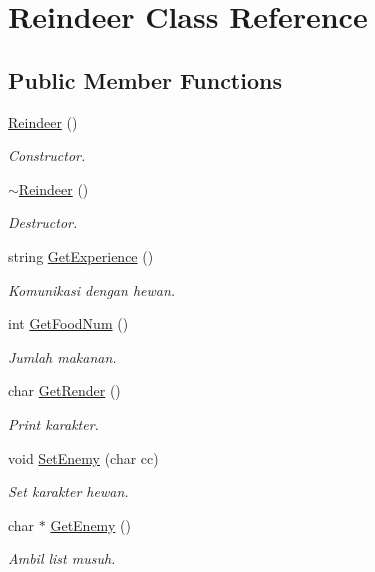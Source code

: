 \hypertarget{class_reindeer}{}\section{Reindeer Class Reference}
\label{class_reindeer}
\subsection*{Public Member Functions}
\begin{DoxyCompactItemize}
\item 
\hyperlink{class_reindeer_abf6ea0887ccaa39ac9b1d927f4833aaa}{Reindeer} ()\hypertarget{class_reindeer_abf6ea0887ccaa39ac9b1d927f4833aaa}{}\label{class_reindeer_abf6ea0887ccaa39ac9b1d927f4833aaa}

\begin{DoxyCompactList}\small\item\em Constructor. \end{DoxyCompactList}\item 
\hyperlink{class_reindeer_a8459e722edfb7c824d65d24420ad082b}{$\sim$\+Reindeer} ()\hypertarget{class_reindeer_a8459e722edfb7c824d65d24420ad082b}{}\label{class_reindeer_a8459e722edfb7c824d65d24420ad082b}

\begin{DoxyCompactList}\small\item\em Destructor. \end{DoxyCompactList}\item 
string \hyperlink{class_reindeer_a2dc5a553f9ae3af3869c0f7a7f5a5401}{Get\+Experience} ()\hypertarget{class_reindeer_a2dc5a553f9ae3af3869c0f7a7f5a5401}{}\label{class_reindeer_a2dc5a553f9ae3af3869c0f7a7f5a5401}

\begin{DoxyCompactList}\small\item\em Komunikasi dengan hewan. \end{DoxyCompactList}\item 
int \hyperlink{class_reindeer_aae7b2882cbffd078f6420ec6f5ca924d}{Get\+Food\+Num} ()
\begin{DoxyCompactList}\small\item\em Jumlah makanan. \end{DoxyCompactList}\item 
char \hyperlink{class_reindeer_a9e7a92aa2ed70fe9f93d826e63918dea}{Get\+Render} ()
\begin{DoxyCompactList}\small\item\em Print karakter. \end{DoxyCompactList}\item 
void \hyperlink{class_reindeer_a074fa6ffde928eefa7b6c276030c65bc}{Set\+Enemy} (char cc)
\begin{DoxyCompactList}\small\item\em Set karakter hewan. \end{DoxyCompactList}\item 
char $\ast$ \hyperlink{class_reindeer_a94bcac7946ecf20129ee82f2fb713d22}{Get\+Enemy} ()
\begin{DoxyCompactList}\small\item\em Ambil list musuh. \end{DoxyCompactList}\end{DoxyCompactItemize}

